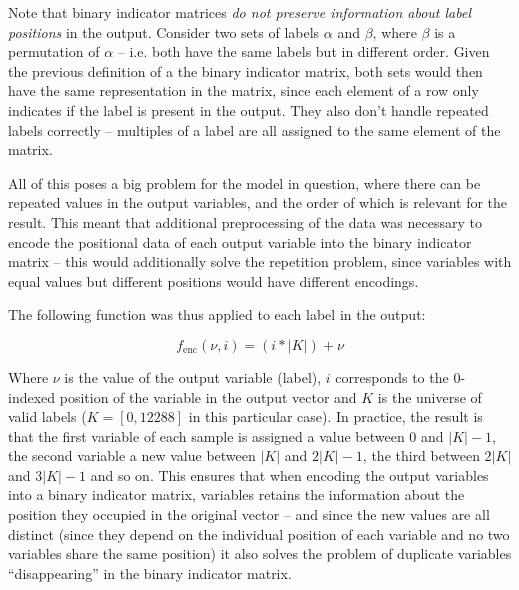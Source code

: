 \documentclass{kthreport}
\theoremstyle{definition}
\begin{document}
Note that binary indicator matrices \emph{do not preserve information about label positions} in the output.
Consider two sets of labels $\alpha$ and $\beta$, where $\beta$ is a permutation of $\alpha$ -- i.e. both have the same labels but in different order. 
Given the previous definition of a the binary indicator matrix, both sets would then have the same representation in the matrix, since each element of a row only indicates if the label is present in the output. 
They also don't handle repeated labels correctly -- multiples of a label are all assigned to the same element of the matrix.

All of this poses a big problem for the model in question, where there can be repeated values in the output variables, and the order of which is relevant for the result. This meant that additional preprocessing of the data was necessary to encode the positional data of each output variable into the binary indicator matrix -- this would additionally solve the repetition problem, since variables with equal values but different positions would have different encodings.

The following function was thus applied to each label in the output:

\begin{equation}
    f_{\text{enc}}(\nu, i) = (i * |K|) + \nu
\end{equation}

Where $\nu$ is the value of the output variable (label), $i$ corresponds to the $0$-indexed position of the variable in the output vector and $K$ is the universe of valid labels ($K = [0, 12288]$ in this particular case). 
In practice, the result is that the first variable of each sample is assigned a value between $0$ and $|K| - 1$, the second variable a new value between $|K|$ and $2|K| - 1$, the third between $2|K|$ and $3|K| - 1$ and so on. 
This ensures that when encoding the output variables into a binary indicator matrix, variables retains the information about the position they occupied in the original vector -- and since the new values are all distinct (since they depend on the individual position of each variable and no two variables share the same position) it also solves the problem of duplicate variables ``disappearing'' in the binary indicator matrix.
\end{document}
